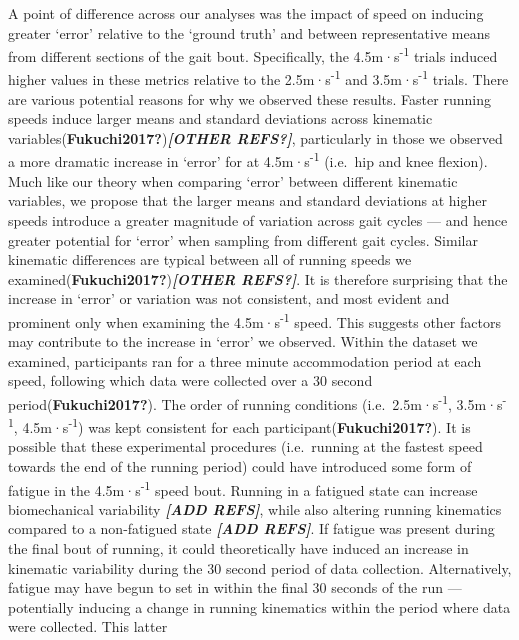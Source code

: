 \documentclass[]{elsarticle} %
\begin{document}
A point of difference across our analyses was the impact of speed on
inducing greater `error' relative to the `ground truth' and between
representative means from different sections of the gait bout.
Specifically, the 4.5m·s\textsuperscript{-1} trials induced higher
values in these metrics relative to the 2.5m·s\textsuperscript{-1} and
3.5m·s\textsuperscript{-1} trials. There are various potential reasons
for why we observed these results. Faster running speeds induce larger
means and standard deviations across kinematic
variables(\textbf{Fukuchi2017?})\textbf{\emph{{[}OTHER REFS?{]}}},
particularly in those we observed a more dramatic increase in `error'
for at 4.5m·s\textsuperscript{-1} (i.e.~hip and knee flexion). Much like
our theory when comparing `error' between different kinematic variables,
we propose that the larger means and standard deviations at higher
speeds introduce a greater magnitude of variation across gait cycles ---
and hence greater potential for `error' when sampling from different
gait cycles. Similar kinematic differences are typical between all of
running speeds we examined(\textbf{Fukuchi2017?})\textbf{\emph{{[}OTHER
REFS?{]}}}. It is therefore surprising that the increase in `error' or
variation was not consistent, and most evident and prominent only when
examining the 4.5m·s\textsuperscript{-1} speed. This suggests other
factors may contribute to the increase in `error' we observed. Within
the dataset we examined, participants ran for a three minute
accommodation period at each speed, following which data were collected
over a 30 second period(\textbf{Fukuchi2017?}). The order of running
conditions (i.e.~2.5m·s\textsuperscript{-1}, 3.5m·s\textsuperscript{-1},
4.5m·s\textsuperscript{-1}) was kept consistent for each
participant(\textbf{Fukuchi2017?}). It is possible that these
experimental procedures (i.e.~running at the fastest speed towards the
end of the running period) could have introduced some form of fatigue in
the 4.5m·s\textsuperscript{-1} speed bout. Running in a fatigued state
can increase biomechanical variability \textbf{\emph{{[}ADD REFS{]}}},
while also altering running kinematics compared to a non-fatigued state
\textbf{\emph{{[}ADD REFS{]}}}. If fatigue was present during the final
bout of running, it could theoretically have induced an increase in
kinematic variability during the 30 second period of data collection.
Alternatively, fatigue may have begun to set in within the final 30
seconds of the run --- potentially inducing a change in running
kinematics within the period where data were collected. This latter
\end{document}
